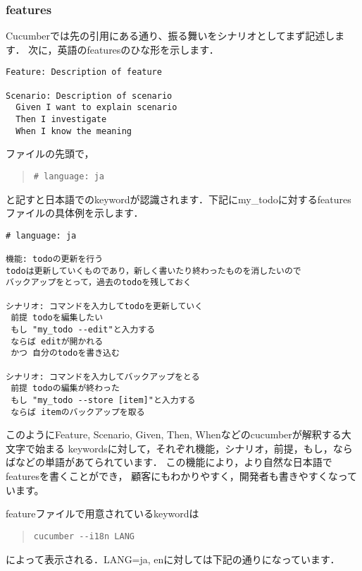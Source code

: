 \subsubsection{features}
Cucumberでは先の引用にある通り、振る舞いをシナリオとしてまず記述します．
次に，英語のfeaturesのひな形を示します．
\begin{lstlisting}[style=customRuby,basicstyle={\scriptsize\ttfamily}]
% cat ./featrues/sample_e.feature
Feature: Description of feature

Scenario: Description of scenario
  Given I want to explain scenario
  Then I investigate
  When I know the meaning
\end{lstlisting}
ファイルの先頭で，
\begin{quote}\begin{verbatim}
# language: ja
\end{verbatim}\end{quote}
と記すと日本語でのkeywordが認識されます．下記にmy\_todoに対するfeaturesファイルの具体例を示します．
\begin{lstlisting}[style=customCsh,basicstyle={\scriptsize\ttfamily}]
# language: ja

機能: todoの更新を行う
todoは更新していくものであり，新しく書いたり終わったものを消したいので
バックアップをとって，過去のtodoを残しておく

シナリオ: コマンドを入力してtodoを更新していく
 前提 todoを編集したい
 もし "my_todo --edit"と入力する
 ならば editが開かれる
 かつ 自分のtodoを書き込む

シナリオ: コマンドを入力してバックアップをとる
 前提 todoの編集が終わった
 もし "my_todo --store [item]"と入力する
 ならば itemのバックアップを取る
\end{lstlisting}
このようにFeature, Scenario, Given, Then, Whenなどのcucumberが解釈する大文字で始まる
keywordsに対して，それぞれ機能，シナリオ，前提，もし，ならばなどの単語があてられています．
この機能により，より自然な日本語でfeaturesを書くことができ，
顧客にもわかりやすく，開発者も書きやすくなっています。

featureファイルで用意されているkeywordは
\begin{quote}\begin{verbatim}
cucumber --i18n LANG
\end{verbatim}\end{quote}
によって表示される．LANG=ja, enに対しては下記の通りになっています．

